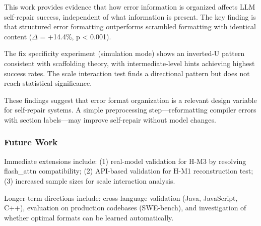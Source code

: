 
This work provides evidence that how error information is organized affects LLM self-repair success, independent of what information is present. The key finding is that structured error formatting outperforms scrambled formatting with identical content ($\Delta$ = +14.4\%, p < 0.001).

The fix specificity experiment (simulation mode) shows an inverted-U pattern consistent with scaffolding theory, with intermediate-level hints achieving highest success rates. The scale interaction test finds a directional pattern but does not reach statistical significance.

These findings suggest that error format organization is a relevant design variable for self-repair systems. A simple preprocessing step---reformatting compiler errors with section labels---may improve self-repair without model changes.

\subsubsection{Future Work}

Immediate extensions include: (1) real-model validation for H-M3 by resolving flash\_attn compatibility; (2) API-based validation for H-M1 reconstruction test; (3) increased sample sizes for scale interaction analysis.

Longer-term directions include: cross-language validation (Java, JavaScript, C++), evaluation on production codebases (SWE-bench), and investigation of whether optimal formats can be learned automatically.
